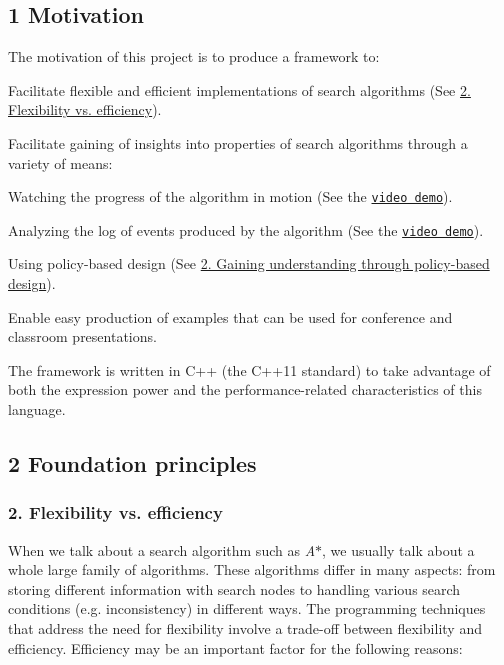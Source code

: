 \hypertarget{index_s-motivation}{}\subsection{1 Motivation}\label{index_s-motivation}
The motivation of this project is to produce a framework to\+:


\begin{DoxyItemize}
\item Facilitate flexible and efficient implementations of search algorithms (See \hyperlink{index_s-flexibility-efficiency}{2. Flexibility vs. efficiency}).
\item Facilitate gaining of insights into properties of search algorithms through a variety of means\+:
\begin{DoxyItemize}
\item Watching the progress of the algorithm in motion (See the \href{https://youtu.be/cElxLWve1Zw}{\tt video demo}).
\item Analyzing the log of events produced by the algorithm (See the \href{https://youtu.be/cElxLWve1Zw}{\tt video demo}).
\item Using policy-\/based design (See \hyperlink{index_s-policy}{2. Gaining understanding through policy-\/based design}).
\end{DoxyItemize}
\item Enable easy production of examples that can be used for conference and classroom presentations.
\end{DoxyItemize}

The framework is written in {\ttfamily C++} (the {\ttfamily C++11} standard) to take advantage of both the expression power and the performance-\/related characteristics of this language.\hypertarget{index_s-principles}{}\subsection{2 Foundation principles}\label{index_s-principles}
\hypertarget{index_s-flexibility-efficiency}{}\subsubsection{2. Flexibility vs. efficiency}\label{index_s-flexibility-efficiency}
When we talk about a search algorithm such as {\itshape A$\ast$}, we usually talk about a whole large family of algorithms. These algorithms differ in many aspects\+: from storing different information with search nodes to handling various search conditions (e.\+g. inconsistency) in different ways. The programming techniques that address the need for flexibility involve a trade-\/off between flexibility and efficiency. Efficiency may be an important factor for the following reasons\+:


